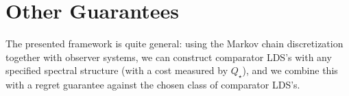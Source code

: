\documentclass[11pt]{article}
\newcommand{\evannote}[1]{\textcolor{red}{\{evan: #1\}}}
\def\R{{\mathcal R}}
\newcommand{\norm}[1]{\left\lVert#1\right\rVert}
\def\R{\ensuremath{\mathcal R}}
\newtheorem{lemma}[theorem]{Lemma}
\numberwithin{equation}{section}
\begin{document}


\section{Other Guarantees}
\label{appendix:otherguarantees}
The presented framework is quite general: using the Markov chain discretization together with observer systems, we can construct comparator LDS's with any specified spectral structure (with a cost measured by $Q_\star$), and we combine this with a regret guarantee against the chosen class of comparator LDS's. 
\end{document}
